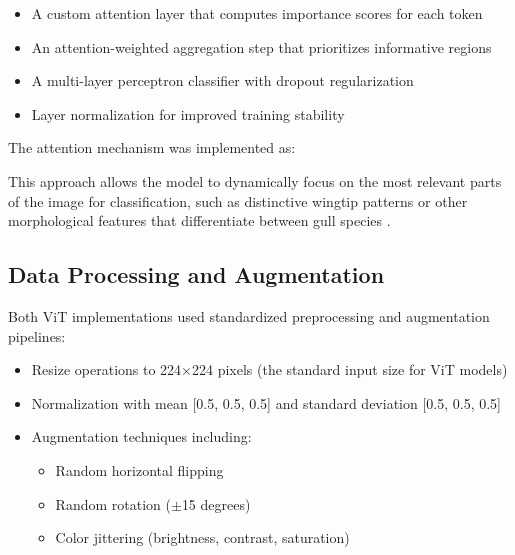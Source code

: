 \documentclass[a4paper,12pt]{article}
\begin{document}
\begin{itemize}
    \item A custom attention layer that computes importance scores for each token
    \item An attention-weighted aggregation step that prioritizes informative regions
    \item A multi-layer perceptron classifier with dropout regularization
    \item Layer normalization for improved training stability
\end{itemize}

The attention mechanism was implemented as:


This approach allows the model to dynamically focus on the most relevant parts of the image for classification, such as distinctive wingtip patterns or other morphological features that differentiate between gull species \citep{stassin2024explainability}.

\subsection{Data Processing and Augmentation}

Both ViT implementations used standardized preprocessing and augmentation pipelines:

\begin{itemize}
    \item Resize operations to 224$\times$224 pixels (the standard input size for ViT models)
    \item Normalization with mean [0.5, 0.5, 0.5] and standard deviation [0.5, 0.5, 0.5]
    \item Augmentation techniques including:
    \begin{itemize}
        \item Random horizontal flipping
        \item Random rotation ($\pm$15 degrees)
        \item Color jittering (brightness, contrast, saturation)
    \end{itemize}
\end{itemize}
\end{document}
